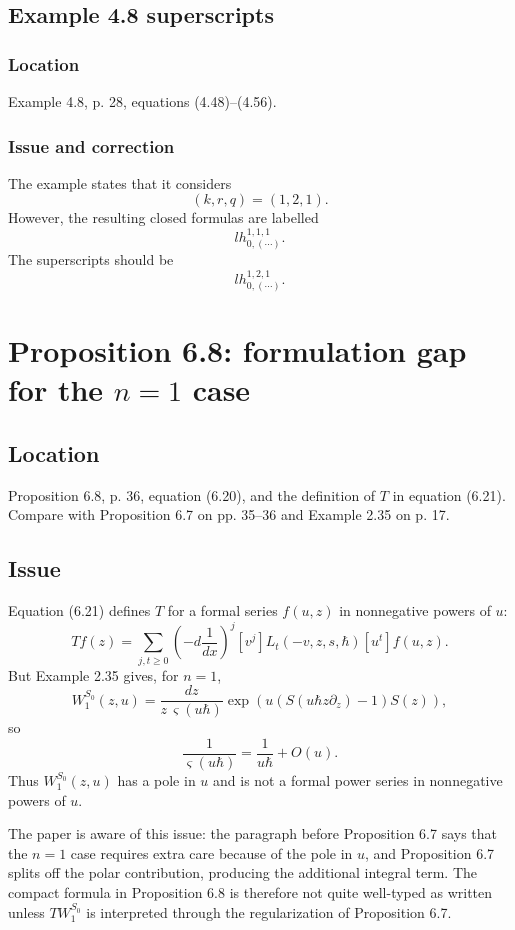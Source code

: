 \documentclass[11pt]{article}
\begin{document}
\subsection{Example 4.8 superscripts}

\subsubsection*{Location}
Example 4.8, p. 28, equations (4.48)--(4.56).

\subsubsection*{Issue and correction}
The example states that it considers
\[
   (k,r,q)=(1,2,1).
\]
However, the resulting closed formulas are labelled
\[
   lh^{1,1,1}_{0,(\cdots)}.
\]
The superscripts should be
\[
   lh^{1,2,1}_{0,(\cdots)}.
\]

\section{Proposition 6.8: formulation gap for the $n=1$ case}

\subsection*{Location}
Proposition 6.8, p. 36, equation (6.20), and the definition of $T$ in equation (6.21).  Compare with Proposition 6.7 on pp. 35--36 and Example 2.35 on p. 17.

\subsection*{Issue}
Equation (6.21) defines $T$ for a formal series $f(u,z)$ in nonnegative powers of $u$:
\[
   T f(z)=\sum_{j,t\geq 0}\left(-d\frac{1}{dx}\right)^j[v^j]L_t(-v,z,s,\hbar)[u^t]f(u,z).
\]
But Example 2.35 gives, for $n=1$,
\[
   W^{S_0}_1(z,u)
   =\frac{dz}{z\,\varsigma(u\hbar)}
     \exp\left(u(S(u\hbar z\partial_z)-1)S(z)\right),
\]
so
\[
   \frac{1}{\varsigma(u\hbar)}=\frac{1}{u\hbar}+O(u).
\]
Thus $W^{S_0}_1(z,u)$ has a pole in $u$ and is not a formal power series in nonnegative powers of $u$.

The paper is aware of this issue: the paragraph before Proposition 6.7 says that the $n=1$ case requires extra care because of the pole in $u$, and Proposition 6.7 splits off the polar contribution, producing the additional integral term.  The compact formula in Proposition 6.8 is therefore not quite well-typed as written unless $T W^{S_0}_1$ is interpreted through the regularization of Proposition 6.7.
\end{document}
